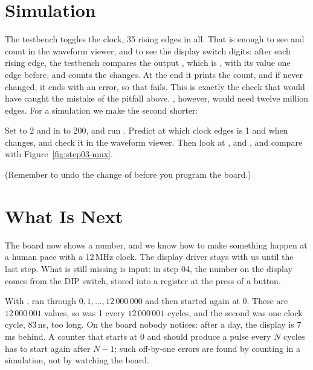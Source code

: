 \section{Simulation}
\label{sec:step03-sim}

The testbench toggles the clock, 35 rising edges in all. That is enough to
see  and  count in the waveform viewer, and to
see the display switch digits: after each rising edge, the testbench compares
the output , which is , with its value one edge before,
and counts the changes. At the end it prints the count, and if 
never changed, it ends with an error, so that  fails. This is
exactly the check that would have caught the mistake of the pitfall above.
, however, would need twelve million edges. For a simulation we make
the second shorter:

\begin{exercise}
\label{ex:step03-sim}
Set  to 2 and  in  to 200, and
run . Predict at which clock edges  is 1 and when
 changes, and check it in the waveform viewer. Then look at
,  and , and compare with
Figure~\ref{fig:step03-mux}.
\end{exercise}

(Remember to undo the change of  before you program the board.)

\section{What Is Next}

The board now shows a number, and we know how to make something happen at a
human pace with a 12\,MHz clock. The display driver  stays with us
until the last step. What is still missing is input: in step 04, the number on
the display comes from the DIP switch, stored into a register at the press of
a button.

\solutions

\solution
With ,  ran through $0, 1, \dots,
12\,000\,000$ and then started again at 0. These are $12\,000\,001$ values, so
 was 1 every $12\,000\,001$ cycles, and the second was one clock
cycle, $83$\,ns, too long. On the board nobody notices: after a day, the
display is 7\,ms behind. A counter that starts at 0 and should produce a pulse
every $N$ cycles has to start again after $N - 1$; such off-by-one errors are
found by counting in a simulation, not by watching the board.

